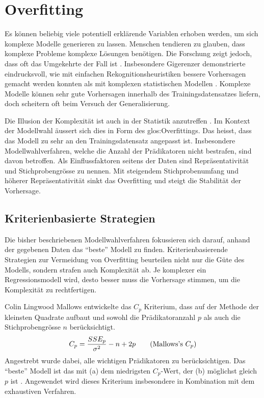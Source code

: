 \section{Overfitting}
Es können beliebig viele potentiell erklärende Variablen erhoben werden, um sich komplexe Modelle generieren zu lassen. 
Menschen tendieren zu glauben, dass komplexe Probleme komplexe Lösungen benötigen. 
Die Forschung zeigt jedoch, dass oft das Umgekehrte der Fall ist \cite[p.3]{armstrong2011illusions}. 
Insbesondere Gigerenzer demonstrierte eindrucksvoll, wie mit einfachen Rekognitionsheuristiken bessere Vorhersagen gemacht werden konnten als mit komplexen statistischen Modellen \cite{borges1999can}.
Komplexe Modelle können sehr gute Vorhersagen innerhalb des Trainingsdatensatzes liefern, doch  scheitern oft beim Versuch der Generalisierung.  

Die Illusion der Komplexität ist auch in der Statistik anzutreffen \cite[p. 3]{armstrong2011illusions}. 
Im Kontext der Modellwahl äussert sich dies in Form des  \Gls{glos:Overfitting}s. Das heisst, dass das Modell zu sehr an den Trainingsdatensatz angepasst ist.
Insbesondere Modellwahlverfahren, welche die Anzahl der Prädikatoren nicht bestrafen, sind davon betroffen.
Als Einflussfaktoren seitens der Daten sind Repräsentativität und Stichprobengrösse zu nennen. 
Mit steigendem Stichprobenumfang und höherer Repräsentativität sinkt das Overfitting und steigt die Stabilität der Vorhersage.

\subsection{Kriterienbasierte Strategien}
Die bisher beschriebenen Modellwahlverfahren fokussieren sich darauf, anhand der gegebenen Daten das ``beste'' Modell zu finden.
Kriterienbasierende Strategien zur Vermeidung von Overfitting beurteilen nicht nur die Güte des Modells, sondern strafen auch Komplexität ab.
Je komplexer ein Regressionsmodell wird, desto besser muss die Vorhersage stimmen, um die Komplexität zu rechtfertigen.

Colin Lingwood Mallows entwickelte das $C_p$ Kriterium, dass auf der Methode der kleinsten Quadrate  aufbaut und sowohl die Prädikatoranzahl $p$ als auch die Stichprobengrösse $n$ berücksichtigt. 
\begin{equation}
C_p={SSE_p \over \sigma^2} - n + 2p
\tag{Mallows's $C_p$}
\end{equation}
Angestrebt wurde dabei, alle wichtigen Prädikatoren zu berücksichtigen. 
Das ``beste'' Modell ist das mit (a) dem niedrigsten $C_p$-Wert, der (b) möglichst gleich $p$ ist \cite{gilmour1996interpretation}. Angewendet wird dieses Kriterium insbesondere in Kombination mit dem exhaustiven Verfahren.

